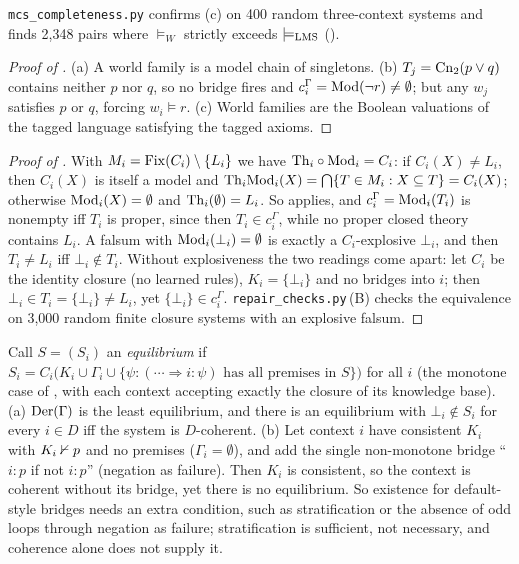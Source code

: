 \texttt{mcs\_completeness.py} confirms (c) on 400 random three-context systems and finds 2{,}348 pairs where $\models_W$ strictly exceeds $\models_{\mathrm{LMS}}$ ().

\begin{proof}[Proof of ]
(a) A world family is a model chain of singletons. (b) $T_j=\mathrm{Cn}_2(p\vee q)$ contains neither $p$ nor $q$, so no bridge fires and $c^\Gamma_i=\mathrm{Mod}(\neg r)\neq\emptyset$; but any $w_j$ satisfies $p$ or $q$, forcing $w_i\models r$. (c) World families are the Boolean valuations of the tagged language satisfying the tagged axioms.
\end{proof}

\begin{proof}[Proof of ]
With $M_i=\mathrm{Fix}(C_i)\setminus\{L_i\}$ we have $\mathrm{Th}_i\circ\mathrm{Mod}_i=C_i$: if $C_i(X)\neq L_i$, then $C_i(X)$ is itself a model and $\mathrm{Th}_i\mathrm{Mod}_i(X)=\bigcap\{T\in M_i:X\subseteq T\}=C_i(X)$; otherwise $\mathrm{Mod}_i(X)=\emptyset$ and $\mathrm{Th}_i(\emptyset)=L_i$. So  applies, and $c^\Gamma_i=\mathrm{Mod}_i(T_i)$ is nonempty iff $T_i$ is proper, since then $T_i\in c^\Gamma_i$, while no proper closed theory contains $L_i$. A falsum with $\mathrm{Mod}_i(\bot_i)=\emptyset$ is exactly a $C_i$-explosive $\bot_i$, and then $T_i\neq L_i$ iff $\bot_i\notin T_i$. Without explosiveness the two readings come apart: let $C_i$ be the identity closure (no learned rules), $K_i=\{\bot_i\}$ and no bridges into $i$; then $\bot_i\in T_i=\{\bot_i\}\neq L_i$, yet $\{\bot_i\}\in c^\Gamma_i$. \texttt{repair\_checks.py}\,(B) checks the equivalence on 3{,}000 random finite closure systems with an explosive falsum.
\end{proof}

\begin{proposition}\label{prop:existence:equilibrium}
Call $S=(S_i)$ an \emph{equilibrium} if $S_i=C_i\big(K_i\cup\Gamma_i\cup\{\psi:(\cdots\Rightarrow i{:}\psi)\text{ has all premises in }S\}\big)$ for all $i$ (the monotone case of \citealt{brewka2007equilibria}, with each context accepting exactly the closure of its knowledge base).
\textup{(a)} $\mathrm{Der}(\Gamma)$ is the least equilibrium, and there is an equilibrium with $\bot_i\notin S_i$ for every $i\in D$ iff the system is $D$-coherent.
\textup{(b)} Let context $i$ have consistent $K_i$ with $K_i\nvdash p$ and no premises ($\Gamma_i=\emptyset$), and add the single non-monotone bridge ``$i{:}p$ if not $i{:}p$'' (negation as failure). Then $K_i$ is consistent, so the context is coherent without its bridge, yet there is no equilibrium. So existence for default-style bridges needs an extra condition, such as stratification or the absence of odd loops through negation as failure; stratification is sufficient, not necessary, and coherence alone does not supply it.
\end{proposition}

